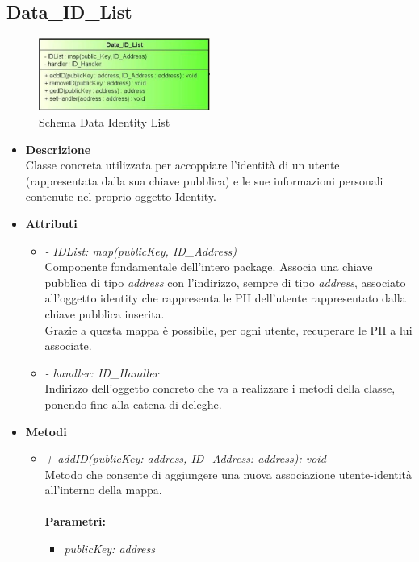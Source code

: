 \subsection{Data\_ID\_List}
\begin{figure}[!h]
	\centering
	\includegraphics[width=0.5\textwidth]{immagini/dataIDList}
	\caption{Schema Data Identity List}
\end{figure}
\begin{itemize}
	\item \textbf{Descrizione}\\
	Classe concreta utilizzata per accoppiare l'identità di un utente (rappresentata dalla sua chiave pubblica) e le sue informazioni personali contenute nel proprio oggetto Identity.
	\item \textbf{Attributi}
	\begin{itemize}
		\item \textit{- IDList: map(publicKey, ID\_Address)}\\
		Componente fondamentale dell'intero package. Associa una chiave pubblica di tipo \textit{address} con l'indirizzo, sempre di tipo \textit{address}, associato all'oggetto identity che rappresenta le \gls{PII} dell'utente rappresentato dalla chiave pubblica inserita.\\
		Grazie a questa mappa è possibile, per ogni utente, recuperare le \gls{PII} a lui associate.
		\item \textit{- handler: ID\_Handler}\\
		Indirizzo dell'oggetto concreto che va a realizzare i metodi della classe, ponendo fine alla catena di deleghe.		
	\end{itemize}
	\item \textbf{Metodi}
	\begin{itemize}
		\item \textit{+ addID(publicKey: address, ID\_Address: address): void}\\
		Metodo che consente di aggiungere una nuova associazione utente-identità all'interno della mappa.\\\\
		\textbf{Parametri:}
		\begin{itemize}
			\item \textit{publicKey: address}\\

\end{itemize}
\end{itemize}
\end{itemize}
